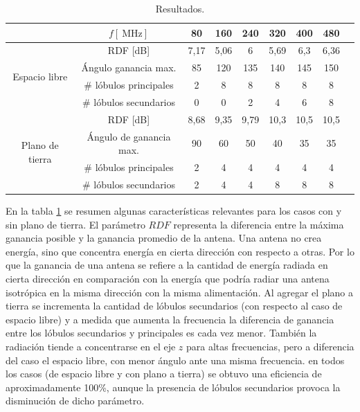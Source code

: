 \begin{table} [H]
	\centering
	\begin{tabular}{ccccccccc}
		\toprule
		& $f [\SI{}{\mega\hertz}]$ 					&  80  & 160  &  240 &  320 &  400 &  480 \\
		\midrule
		\multirow{4}{*}{Espacio libre} & RDF [dB] 	& 7,17 & 5,06 & 6    & 5,69 & 6,3  & 6,36 \\ 
				\cline{2-8}
				& Ángulo ganancia max. 				& 85   & 120  & 135  & 140  & 145  & 150  \\ 
				\cline{2-8}
				& $\#$ lóbulos principales 			& 2    & 8    & 8    & 8    & 8    & 8 \\  
				\cline{2-8}
				& $\#$ lóbulos secundarios 			& 0    & 0    & 2    & 4    & 6    & 8\\
				\midrule		
		\multirow{4}{*}{Plano de tierra} & RDF [dB] & 8,68 & 9,35 & 9,79 & 10,3 & 10,5 & 10,5 \\
				\cline{2-8}
				& Ángulo de ganancia max.			& 90   & 60  & 50  & 40  & 35  & 35 \\
				\cline{2-8}
				& $\#$ lóbulos principales 			& 2    & 4   & 4   & 4   & 4   & 4 \\
				\cline{2-8}
				& $\#$ lóbulos secundarios 			& 2    & 4   & 4   & 8   & 8   & 8 \\
		\bottomrule
	\end{tabular}
	\caption{Resultados.}
	\label{tab.resultados}
\end{table}


En la tabla \ref{tab.resultados} se resumen algunas características relevantes para los casos con y sin plano de tierra. El parámetro $RDF$ representa la diferencia entre la máxima ganancia posible y la ganancia promedio de la antena. Una antena no crea energía, sino que concentra energía en cierta dirección con respecto a otras. Por lo que la ganancia de una antena se refiere a la cantidad de energía radiada en cierta dirección en comparación con la energía que podría radiar una antena isotrópica en la misma dirección con la misma alimentación.
Al agregar el plano a tierra se incrementa la cantidad de lóbulos secundarios (con respecto al caso de espacio libre) y a medida que aumenta la frecuencia la diferencia de ganancia entre los lóbulos secundarios y principales es cada vez menor. También la radiación tiende a concentrarse en el eje $z$ para altas frecuencias, pero a diferencia del caso el espacio libre, con menor ángulo ante una misma frecuencia.
en todos los casos (de espacio libre y con plano a tierra) se obtuvo una eficiencia de aproximadamente 100\%, aunque la presencia de lóbulos secundarios provoca la disminución de dicho parámetro.




